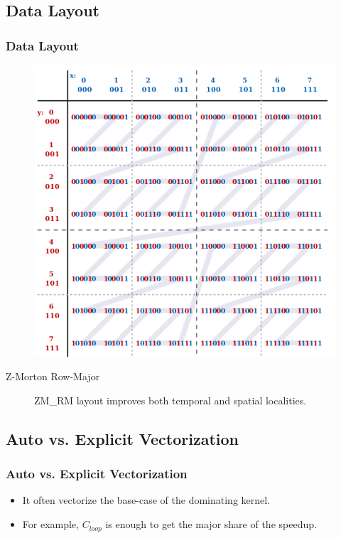 \subsection{Data Layout}
\begin{frame}
    \frametitle{Data Layout}
	\begin{figure}
		\includegraphics[scale=0.2]{figure/fig-z-morton.png}
	\end{figure}
	\begin{description}
		\item[Z-Morton Row-Major] ZM\_RM layout improves both temporal and 
			spatial localities.
	\end{description}
\end{frame}

\subsection{Auto vs. Explicit Vectorization}
\begin{frame}
    \frametitle{Auto vs. Explicit Vectorization}
	\begin{itemize}
		\item It often vectorize the base-case of the dominating kernel. 
		\item For example, $C_{\textit{loop}}$ is enough to get the 
			major share of the speedup.
	\end{itemize}
\end{frame}
